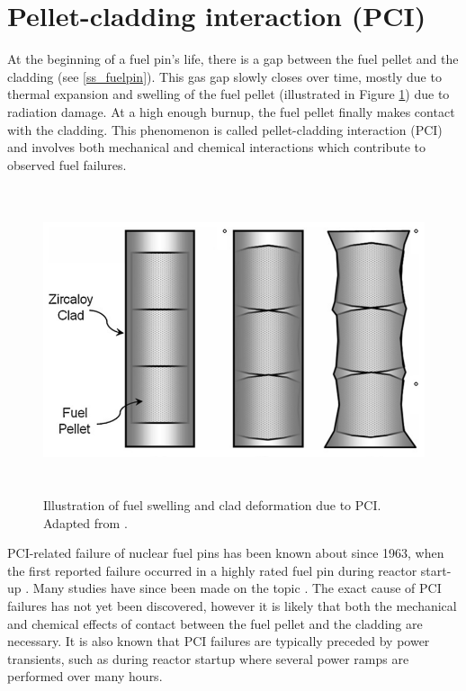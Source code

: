 \section{Pellet-cladding interaction (PCI)}

At the beginning of a fuel pin's life, there is a gap between the fuel pellet and the cladding (see \ref{ss_fuelpin}). This gas gap slowly closes over time, mostly due to thermal expansion and swelling of the fuel pellet (illustrated in Figure \ref{figure:pcmi}) due to radiation damage. At a high enough burnup, the fuel pellet finally makes contact with the cladding. This phenomenon is called pellet-cladding interaction (PCI) and involves both mechanical and chemical interactions which contribute to observed fuel failures.

\begin{figure}[ht]
\centering
\includegraphics[height=9cm]{images/pcmi.png}
\caption[Illustration of fuel swelling and clad deformation due to PCI.]{Illustration of fuel swelling and clad deformation due to PCI. Adapted from \cite{alam2011review}.}
\label{figure:pcmi}
\end{figure}

PCI-related failure of nuclear fuel pins has been known about since 1963, when the first reported failure occurred in a highly rated fuel pin during reactor start-up \cite{lyons1963high}. Many studies have since been made on the topic \cite{alam2011review, bcoxpelletclad1990}. The exact cause of PCI failures has not yet been discovered, however it is likely that both the mechanical and chemical effects of contact between the fuel pellet and the cladding are necessary. It is also known that PCI failures are typically preceded by power transients, such as during reactor startup where several power ramps are performed over many hours.

